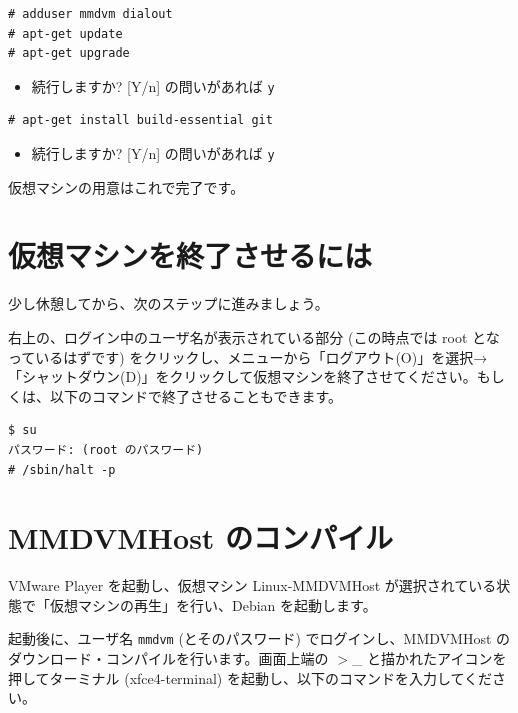 \documentclass[a4j,oneside]{ujbook}
\begin{document}
\begin{verbatim}
# adduser mmdvm dialout
# apt-get update
# apt-get upgrade
\end{verbatim}
\begin{itemize}
 \renewcommand{\labelitemi}{$\triangleright$}
 \item 続行しますか? [Y/n] の問いがあれば \verb+y+
\end{itemize}
\begin{verbatim}
# apt-get install build-essential git
\end{verbatim}
\begin{itemize}
 \renewcommand{\labelitemi}{$\triangleright$}
 \item 続行しますか? [Y/n] の問いがあれば \verb+y+
\end{itemize}

仮想マシンの用意はこれで完了です。 %

\section{仮想マシンを終了させるには}
少し休憩してから、次のステップに進みましょう。

右上の、ログイン中のユーザ名が表示されている部分 (この時点では root となっているはずです) をクリックし、メニューから「ログアウト(O)」を選択→「シャットダウン(D)」をクリックして仮想マシンを終了させてください。もしくは、以下のコマンドで終了させることもできます。

\begin{verbatim}
$ su
パスワード: (root のパスワード)
# /sbin/halt -p
\end{verbatim}

\section{MMDVMHost のコンパイル}

VMware Player を起動し、仮想マシン Linux-MMDVMHost が選択されている状態で「仮想マシンの再生」を行い、Debian を起動します。

起動後に、ユーザ名 \verb+mmdvm+ (とそのパスワード) でログインし、MMDVMHost のダウンロード・コンパイルを行います。画面上端の $>$\_ と描かれたアイコンを押してターミナル (xfce4-terminal) を起動し、以下のコマンドを入力してください。
\end{document}
